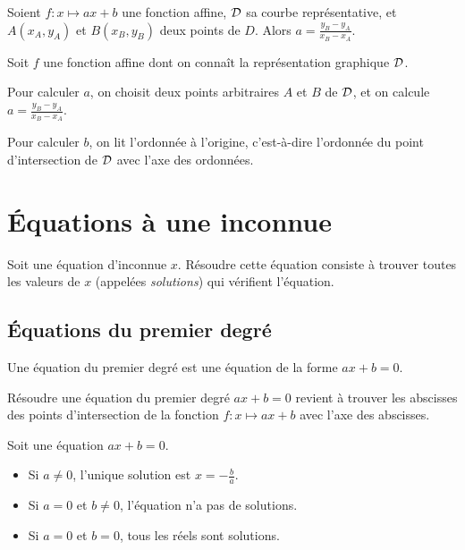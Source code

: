 \begin{propriete}
  Soient $f:x\mapsto ax+b$ une fonction affine, $\cal D$ sa courbe
  représentative, et $A(x_A,y_A)$ et $B(x_B,y_B)$ deux points de $D$. Alors
  $a=\frac{y_B-y_A}{x_B-x_A}$.
\end{propriete}

\begin{methode} Soit $f$ une fonction affine dont on connaît la représentation graphique $\cal D$.

  Pour calculer $a$, on choisit deux points arbitraires $A$ et $B$ de $\cal
  D$, et on calcule $a=\frac{y_B-y_A}{x_B-x_A}$.

  Pour calculer $b$, on lit l'ordonnée à l'origine, c'est-à-dire l'ordonnée
  du point d'intersection de $\cal D$ avec l'axe des ordonnées.
\end{methode}


\section{Équations à une inconnue}

\begin{definition}
  Soit une équation d'inconnue $x$. Résoudre cette équation consiste à trouver
  toutes les valeurs de $x$ (appelées \emph{solutions}) qui vérifient
  l'équation.
\end{definition}

\subsection{Équations du premier degré}

\begin{definition}
  Une équation du premier degré est une équation de la forme $ax+b=0$.
\end{definition}

\begin{remarque}
  Résoudre une équation du premier degré $ax+b=0$ revient à trouver les abscisses des points d'intersection de la fonction $f:x\mapsto ax+b$ avec l'axe des abscisses.
\end{remarque}

\begin{propriete}
  Soit une équation $ax+b=0$.

  \begin{itemize}
    \item Si $a\neq0$, l'unique solution est $x=-\frac{b}{a}$.
    \item Si $a=0$ et $b\neq0$, l'équation n'a pas de solutions.
    \item Si $a=0$ et $b=0$, tous les réels sont solutions.
  \end{itemize}
\end{propriete}

